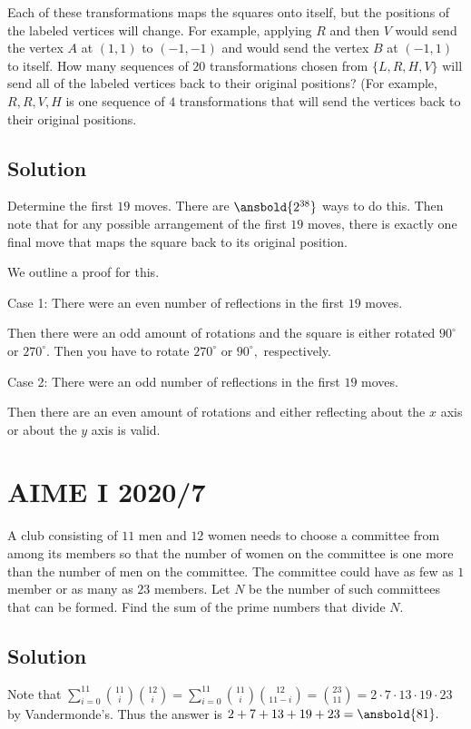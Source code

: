 \documentclass{article}
\begin{document}
Each of these transformations maps the squares onto itself, but the positions of the labeled vertices will change. For example, applying $R$ and then $V$ would send the vertex $A$ at $(1,1)$ to $(-1,-1)$ and would send the vertex $B$ at $(-1,1)$ to itself. How many sequences of $20$ transformations chosen from $\{L, R, H, V\}$ will send all of the labeled vertices back to their original positions? (For example, $R, R, V, H$ is one sequence of $4$ transformations that will send the vertices back to their original positions.

\subsection{Solution}
Determine the first $19$ moves. There are $\ansbold{2^{38}}$ ways to do this. Then note that for any possible arrangement of the first $19$ moves, there is exactly one final move that maps the square back to its original position.
    
We outline a proof for this.
    
Case 1: There were an even number of reflections in the first $19$ moves.

Then there were an odd amount of rotations and the square is either rotated $90^{\circ}$ or $270^{\circ}.$ Then you have to rotate $270^{\circ}$ or $90^{\circ},$ respectively.

Case 2: There were an odd number of reflections in the first $19$ moves.

Then there are an even amount of rotations and either reflecting about the $x$ axis or about the $y$ axis is valid.

\pagebreak\section{AIME I 2020/7}
A club consisting of $11$ men and $12$ women needs to choose a committee from among its members so that the number of women on the committee is one more than the number of men on the committee. The committee could have as few as $1$ member or as many as $23$ members. Let $N$ be the number of such committees that can be formed. Find the sum of the prime numbers that divide $N.$

\subsection{Solution}
Note that $\sum_{i=0}^{11}\binom{11}{i}\binom{12}{i}=\sum_{i=0}^{11}\binom{11}{i}\binom{12}{11-i}=\binom{23}{11}=2\cdot 7\cdot 13\cdot 19\cdot 23$ by Vandermonde's. Thus the answer is $2+7+13+19+23=\ansbold{81}.$
    
\end{document}
